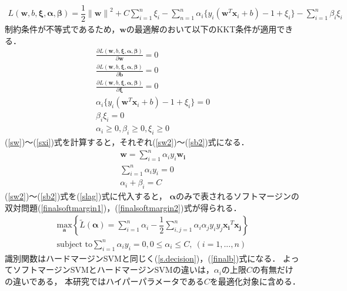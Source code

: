 \begin{align}
    \label{slag}
    L(\boldsymbol{w},b,\boldsymbol{\xi},\boldsymbol{\alpha},\boldsymbol{\beta}) 
    = \dfrac{1}{2}{\|\boldsymbol{{w}}\|}^2+C\sum_{i=1}^{n}\xi_i
    - \sum_{n = 1}^{n} \alpha_i \{y_i(\boldsymbol{w}^T \boldsymbol{x}_i + b)-1+\xi_i\}
    -\sum_{i=1}^{n}\beta_i\xi_i
\end{align}
制約条件が不等式であるため，$\boldsymbol{w}$の最適解のおいて以下のKKT条件が適用できる．
\begin{subequations}
\begin{align}
   \frac{\partial L(\boldsymbol{w},b,\boldsymbol{\xi},\boldsymbol{\alpha},\boldsymbol{\beta})}{\partial \boldsymbol{w}} = 0\label{sw}\\
    \frac{\partial L(\boldsymbol{w},b,\boldsymbol{\xi},\boldsymbol{\alpha},\boldsymbol{\beta})}{\partial \boldsymbol{b}} = 0\label{sb}\\
    \frac{\partial L(\boldsymbol{w},b,\boldsymbol{\xi},\boldsymbol{\alpha},\boldsymbol{\beta})}{\partial \boldsymbol{\xi}} = 0\label{sxi}\\
    \alpha_i \{y_i(\boldsymbol{w}^T \boldsymbol{x}_i + b)-1+\xi_i\}=0\label{sSupport}\\
    \beta_i\xi_i = 0\label{bxi}\\
    \alpha_i \geq 0 ,\beta_i \geq 0,\xi_i \geq 0 
\end{align}
\end{subequations}
 (\ref{sw})〜(\ref{sxi})式を計算すると，それぞれ(\ref{sw2})〜(\ref{sb2})式になる．
 \begin{subequations}
 \begin{align}
   \boldsymbol{w} = \sum_{i=1}^{n}\alpha_i y_i \boldsymbol{w_i} \label{sw2}\\
   \sum_{i=1}^{n}\alpha_i y_i = 0 \\
   \alpha_i + \beta_i = C\label{sb2}
 \end{align}
\end{subequations}
(\ref{sw2})〜(\ref{sb2})式を(\ref{slag})式に代入すると，
$\boldsymbol{\alpha}$のみで表されるソフトマージンの双対問題(\ref{finalsoftmargin1})，(\ref{finalsoftmargin2})式が得られる．
\begin{subequations}
\begin{align} 
    \underset{\boldsymbol{a}}{\text{max}} \left\{\tilde{L}(\boldsymbol{\alpha}) 
    = \sum_{i=1}^{n}\alpha_i - \dfrac{1}{2}\sum_{i,j=1}^{n}\label{finalsoftmargin1}
    \alpha_i\alpha_j y_i y_j \boldsymbol{x_i}^T \boldsymbol{x_j}\right\} \\
    \text{subject to} \sum_{i=1}^{n}\alpha_i y_i = 0,0 \leq \alpha_i \leq C,\ (i=1,...,n)\label{finalsoftmargin2}
\end{align}
\end{subequations}
識別関数はハードマージンSVMと同じく(\ref{s.decision})，(\ref{finalb})式になる．
よってソフトマージンSVMとハードマージンSVMの違いは，$\alpha_i$の上限$C$の有無だけの違いである，
本研究ではハイパーパラメータである$C$を最適化対象に含める．

